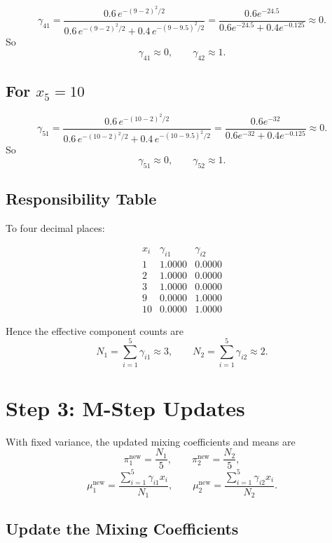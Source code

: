 \documentclass[11pt]{article}
\begin{document}
\[
    \gamma_{41}
    =
    \frac{0.6\,e^{-(9-2)^2/2}}
    {0.6\,e^{-(9-2)^2/2}+0.4\,e^{-(9-9.5)^2/2}}
    =
    \frac{0.6e^{-24.5}}{0.6e^{-24.5}+0.4e^{-0.125}}
    \approx 0.
\]
So
\[
    \gamma_{41}\approx 0,\qquad \gamma_{42}\approx 1.
\]

\subsection*{For \(x_5=10\)}

\[
    \gamma_{51}
    =
    \frac{0.6\,e^{-(10-2)^2/2}}
    {0.6\,e^{-(10-2)^2/2}+0.4\,e^{-(10-9.5)^2/2}}
    =
    \frac{0.6e^{-32}}{0.6e^{-32}+0.4e^{-0.125}}
    \approx 0.
\]
So
\[
    \gamma_{51}\approx 0,\qquad \gamma_{52}\approx 1.
\]

\subsection*{Responsibility Table}

To four decimal places:

\[
\begin{array}{c|cc}
    x_i & \gamma_{i1} & \gamma_{i2}\\
    \hline
    1  & 1.0000 & 0.0000\\
    2  & 1.0000 & 0.0000\\
    3  & 1.0000 & 0.0000\\
    9  & 0.0000 & 1.0000\\
    10 & 0.0000 & 1.0000
\end{array}
\]

Hence the effective component counts are
\[
    N_1=\sum_{i=1}^5 \gamma_{i1}\approx 3,
    \qquad
    N_2=\sum_{i=1}^5 \gamma_{i2}\approx 2.
\]

\section*{Step 3: M-Step Updates}

With fixed variance, the updated mixing coefficients and means are
\[
    \pi_1^{\text{new}}=\frac{N_1}{5},
    \qquad
    \pi_2^{\text{new}}=\frac{N_2}{5},
\]
\[
    \mu_1^{\text{new}}
    =
    \frac{\sum_{i=1}^5 \gamma_{i1}x_i}{N_1},
    \qquad
    \mu_2^{\text{new}}
    =
    \frac{\sum_{i=1}^5 \gamma_{i2}x_i}{N_2}.
\]

\subsection*{Update the Mixing Coefficients}
\end{document}
